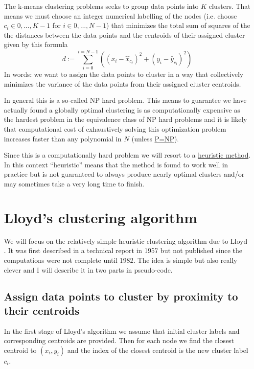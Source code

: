 The k-means clustering problems seeks to group data points into $K$ clusters. That means we must choose an integer numerical labelling of the nodes (i.e. choose $c_i\in 0, \ldots, K-1$ for $i \in 0, \ldots, N-1$) that minimizes the total sum of squares of the the distances between the data points and the centroids of their assigned cluster given by this formula
\[
d:=\sum_{i=0}^{i=N-1} \left( (x_i - \hat{x}_{c_i})^2 + (y_i - \hat{y}_{c_i})^2 \right)
\]
In words: we want to assign the data points to cluster in a way that collectively minimizes the variance of the data points from their assigned cluster centroids. 

In general this is a so-called NP hard problem. This means to guarantee we have actually found a globally optimal clustering is as computationally expensive as the hardest problem in the equivalence class of NP hard problems and it is  likely that computational cost of exhaustively solving this optimization problem increases faster than any polynomial in $N$ (unless \href{https://en.wikipedia.org/wiki/NP-hardness}{P=NP}).

Since this is a computationally hard problem we will resort to a \href{https://en.wikipedia.org/wiki/Heuristic}{heuristic method}. In this context ``heuristic'' means that the method is found to work well in practice but is not guaranteed to always produce nearly optimal clusters and/or may sometimes take a very long time to finish.

\newpage
\section{Lloyd's clustering algorithm}

We will focus on the relatively simple heuristic clustering algorithm due to Lloyd \cite{lloyd1982least}. It was first described in a technical report in 1957 but not published since the computations were not complete until 1982. The idea is simple but also really clever and I will describe it in two parts in pseudo-code. 

\subsection{Assign data points to cluster by proximity to their centroids}
In the first stage of Lloyd's algorithm we assume that initial cluster labels and corresponding centroids are provided. Then for each node we find the closest centroid to $(x_i,y_i)$ and the index of the closest centroid is the new cluster label $c_i$. 

